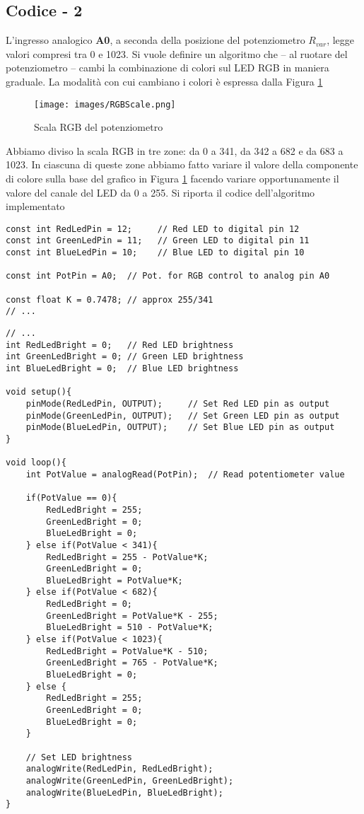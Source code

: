\subsection{Codice - 2}
L’ingresso analogico \textbf{A0}, a seconda della posizione del potenziometro $R_{var}$, legge valori compresi tra 0 e 1023. Si vuole  definire un algoritmo che – al ruotare del potenziometro – cambi la combinazione di colori sul LED RGB in maniera graduale. La modalità con cui cambiano i colori è espressa dalla Figura \ref{fig:RGBScale}
\begin{figure}[H]
    \centering
    \texttt{[image: images/RGBScale.png]}
    \caption{Scala RGB del potenziometro}
    \label{fig:RGBScale}
\end{figure}
Abbiamo diviso la scala RGB in tre zone: da 0 a 341, da 342 a 682 e da 683 a 1023. In ciascuna di queste zone abbiamo fatto variare il valore della componente di colore sulla base del grafico in Figura \ref{fig:RGBScale} facendo variare opportunamente il valore del canale del LED da 0 a 255. Si riporta il codice dell'algoritmo implementato
\begin{lstlisting}[frame=single, language=Arduino]
const int RedLedPin = 12;     // Red LED to digital pin 12
const int GreenLedPin = 11;   // Green LED to digital pin 11
const int BlueLedPin = 10;    // Blue LED to digital pin 10

const int PotPin = A0;  // Pot. for RGB control to analog pin A0

const float K = 0.7478; // approx 255/341
// ...
\end{lstlisting}
\clearpage
\begin{lstlisting}[frame=single, language=Arduino]
// ...
int RedLedBright = 0;   // Red LED brightness
int GreenLedBright = 0; // Green LED brightness
int BlueLedBright = 0;  // Blue LED brightness

void setup(){
    pinMode(RedLedPin, OUTPUT);     // Set Red LED pin as output
    pinMode(GreenLedPin, OUTPUT);   // Set Green LED pin as output
    pinMode(BlueLedPin, OUTPUT);    // Set Blue LED pin as output
}

void loop(){
    int PotValue = analogRead(PotPin);  // Read potentiometer value

    if(PotValue == 0){
        RedLedBright = 255;
        GreenLedBright = 0;
        BlueLedBright = 0;
    } else if(PotValue < 341){
        RedLedBright = 255 - PotValue*K;
        GreenLedBright = 0;
        BlueLedBright = PotValue*K;
    } else if(PotValue < 682){
        RedLedBright = 0;
        GreenLedBright = PotValue*K - 255;
        BlueLedBright = 510 - PotValue*K;
    } else if(PotValue < 1023){
        RedLedBright = PotValue*K - 510;
        GreenLedBright = 765 - PotValue*K;
        BlueLedBright = 0;
    } else {
        RedLedBright = 255;
        GreenLedBright = 0;
        BlueLedBright = 0;
    }

    // Set LED brightness
    analogWrite(RedLedPin, RedLedBright); 
    analogWrite(GreenLedPin, GreenLedBright);
    analogWrite(BlueLedPin, BlueLedBright);   
}
\end{lstlisting}
